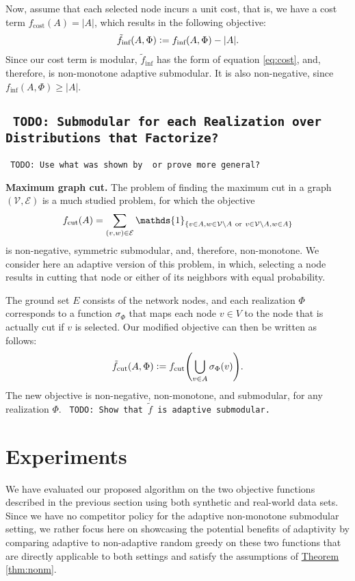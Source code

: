 \documentclass{article}
\newcommand{\todo}[1]{\noindent\texttt{\small\color[rgb]{0.5,0.1,0.1} TODO: #1}}
\newcommand{\theoremref}[1]{\hyperref[#1]{Theorem \ref*{#1}}}
\newcommand{\defeq}{\vcentcolon=}
\let\originalleft\left
\let\originalright\right
\renewcommand{\left}{\mathopen{}\mathclose\bgroup\originalleft}
\renewcommand{\right}{\aftergroup\egroup\originalright}
\renewcommand{\paragraph}[1]{\vspace{0.3em}\noindent\textbf{#1.}\makebox[0.5em]{}}
\begin{document}
Now, assume that each selected node incurs a unit cost, that is, we have a cost term $f_{\textrm{cost}}(A) = |A|$, which results in the following objective:
\begin{align*}
  \tilde{f}_{\textrm{inf}}(A, \Phi) \defeq f_{\textrm{inf}}(A, \Phi) - |A|.
\end{align*}
Since our cost term is modular, $\tilde{f}_{\textrm{inf}}$ has the form of equation \eqref{eq:cost}, and, therefore, is non-monotone adaptive submodular.
It is also non-negative, since $f_{\textrm{inf}}(A, \Phi) \geq |A|$.

\subsection{\todo{Submodular for each Realization over Distributions that Factorize?}}
\todo{Use what was shown by \cite{golovin11} or prove more general?}

\paragraph{Maximum graph cut}
The problem of finding the maximum cut in a graph $(\mathcal{V}, \mathcal{E})$ is a much studied problem, for which the objective
\begin{align*}
  f_{\textrm{cut}}(A) = \sum_{(v, w) \in \mathcal{E}} \mathds{1}_{\left\{v \in A, w \in \mathcal{V}\setminus A\ \textrm{or}\ v \in \mathcal{V}\setminus A, w \in A\right\}}
\end{align*}
is non-negative, symmetric submodular, and, therefore, non-monotone.
We consider here an adaptive version of this problem, in which, selecting a node results in cutting that node or either of its neighbors with equal probability.

The ground set $E$ consists of the network nodes, and each realization $\Phi$ corresponds to a function $\sigma_{\Phi}$ that maps each node $v \in V$ to the node that is actually cut if $v$ is selected.
Our modified objective can then be written as follows:
\begin{align*}
  \tilde{f}_{\textrm{cut}}(A, \Phi) \defeq f_{\textrm{cut}}\left(\bigcup_{v \in A}\sigma_{\Phi}(v)\right).
\end{align*}
The new objective is non-negative, non-monotone, and submodular, for any realization $\Phi$. \todo{Show that $\tilde{f}$ is adaptive submodular.}

\section{Experiments}
We have evaluated our proposed algorithm on the two objective functions described in the previous section using both synthetic and real-world data sets.
Since we have no competitor policy for the adaptive non-monotone submodular setting, we rather focus here on showcasing the potential benefits of adaptivity by comparing adaptive to non-adaptive random greedy on these two functions that are directly applicable to both settings and satisfy the assumptions of \theoremref{thm:nonm}.
\end{document}
